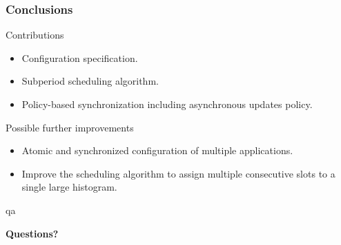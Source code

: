 \documentclass[]{prezentare}
\begin{document}
\begin{frame}
	\frametitle{Conclusions}

	\begin{block}{Contributions}
	\begin{itemize}
	\item Configuration specification.
	\item Subperiod scheduling algorithm.
	\item Policy-based synchronization including asynchronous updates policy.
	\end{itemize}		
	\end{block}

	\begin{block}{Possible further improvements}
	\begin{itemize}
	\item Atomic and synchronized configuration of multiple applications.
	\item Improve the scheduling algorithm to assign multiple consecutive slots to a single large histogram.
	\end{itemize}		
	\end{block}

\end{frame}
    \begin{frame}

    \begin{beamercolorbox}[rounded=true,shadow=true]{qa}
    \begin{center}
        {\Huge \textbf{Questions?}}
    \end{center}
    \end{beamercolorbox}
    \end{frame}
\end{document}
